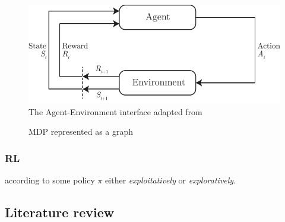 \begin{figure}[!htb]
    \centering
    \includegraphics[scale=1]{../include/agent-environment-loop.pdf}
    \caption{The Agent-Environment interface adapted from \citep{RLBook2018}}
    \label{fig:agent-environment}
\end{figure}


\begin{figure}[!htb]
    \centering
    \caption{MDP represented as a graph}
    \label{fig:mdp-graph-repr}
\end{figure}

\subsubsection{RL}
according to some policy $\pi$ either \textit{exploitatively} or \textit{exploratively}.

\subsection{Literature review}

\cite{AbdulhaiPringleKarakoulas}
\cite{StateRepresentations}
\cite{ExploringRewardDefinitions}
